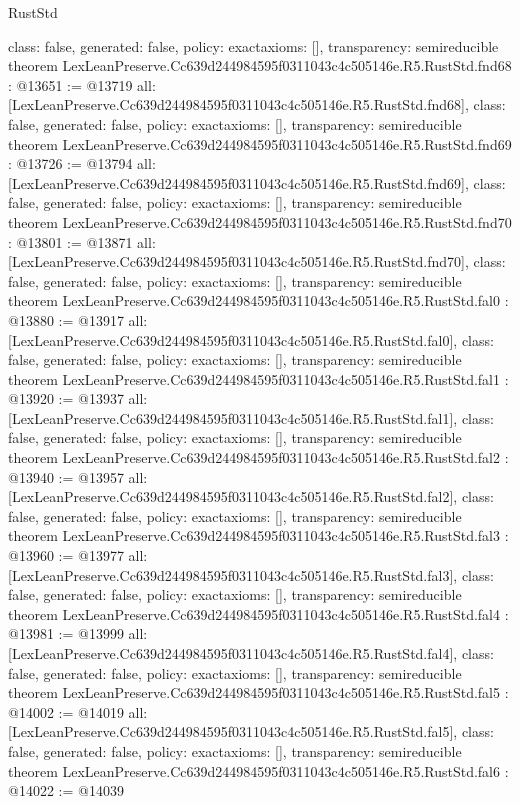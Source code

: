 \begin{lexlean}{RustStd}
\begin{coremodule}
{  class: false,
  generated: false,
  policy: exact{axioms: []},
  transparency: semireducible
}
theorem LexLeanPreserve.Cc639d244984595f0311043c4c505146e.R5.RustStd.fnd68 : @13651 := @13719 {
  all: [LexLeanPreserve.Cc639d244984595f0311043c4c505146e.R5.RustStd.fnd68],
  class: false,
  generated: false,
  policy: exact{axioms: []},
  transparency: semireducible
}
theorem LexLeanPreserve.Cc639d244984595f0311043c4c505146e.R5.RustStd.fnd69 : @13726 := @13794 {
  all: [LexLeanPreserve.Cc639d244984595f0311043c4c505146e.R5.RustStd.fnd69],
  class: false,
  generated: false,
  policy: exact{axioms: []},
  transparency: semireducible
}
theorem LexLeanPreserve.Cc639d244984595f0311043c4c505146e.R5.RustStd.fnd70 : @13801 := @13871 {
  all: [LexLeanPreserve.Cc639d244984595f0311043c4c505146e.R5.RustStd.fnd70],
  class: false,
  generated: false,
  policy: exact{axioms: []},
  transparency: semireducible
}
theorem LexLeanPreserve.Cc639d244984595f0311043c4c505146e.R5.RustStd.fal0 : @13880 := @13917 {
  all: [LexLeanPreserve.Cc639d244984595f0311043c4c505146e.R5.RustStd.fal0],
  class: false,
  generated: false,
  policy: exact{axioms: []},
  transparency: semireducible
}
theorem LexLeanPreserve.Cc639d244984595f0311043c4c505146e.R5.RustStd.fal1 : @13920 := @13937 {
  all: [LexLeanPreserve.Cc639d244984595f0311043c4c505146e.R5.RustStd.fal1],
  class: false,
  generated: false,
  policy: exact{axioms: []},
  transparency: semireducible
}
theorem LexLeanPreserve.Cc639d244984595f0311043c4c505146e.R5.RustStd.fal2 : @13940 := @13957 {
  all: [LexLeanPreserve.Cc639d244984595f0311043c4c505146e.R5.RustStd.fal2],
  class: false,
  generated: false,
  policy: exact{axioms: []},
  transparency: semireducible
}
theorem LexLeanPreserve.Cc639d244984595f0311043c4c505146e.R5.RustStd.fal3 : @13960 := @13977 {
  all: [LexLeanPreserve.Cc639d244984595f0311043c4c505146e.R5.RustStd.fal3],
  class: false,
  generated: false,
  policy: exact{axioms: []},
  transparency: semireducible
}
theorem LexLeanPreserve.Cc639d244984595f0311043c4c505146e.R5.RustStd.fal4 : @13981 := @13999 {
  all: [LexLeanPreserve.Cc639d244984595f0311043c4c505146e.R5.RustStd.fal4],
  class: false,
  generated: false,
  policy: exact{axioms: []},
  transparency: semireducible
}
theorem LexLeanPreserve.Cc639d244984595f0311043c4c505146e.R5.RustStd.fal5 : @14002 := @14019 {
  all: [LexLeanPreserve.Cc639d244984595f0311043c4c505146e.R5.RustStd.fal5],
  class: false,
  generated: false,
  policy: exact{axioms: []},
  transparency: semireducible
}
theorem LexLeanPreserve.Cc639d244984595f0311043c4c505146e.R5.RustStd.fal6 : @14022 := @14039 {
}
\end{coremodule}
\end{lexlean}
